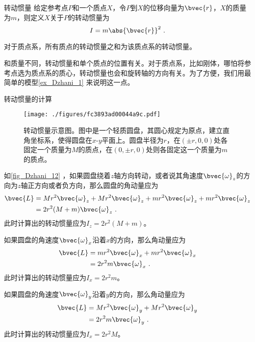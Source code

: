 \begin{definition}{转动惯量}
给定参考点$P$和一个质点$X$，令$P$到$X$的位移向量为$\bvec{r}$，$X$的质量为$m$，则定义$X$关于$P$的转动惯量为
\begin{equation}
I=m\abs{\bvec{r}}^2~. 
\end{equation}

对于质点系，所有质点的转动惯量之和为该质点系的转动惯量。
\end{definition}


和质量不同，转动惯量和单个质点的位置有关。对于质点系，比如刚体，哪怕将参考点选为质点系的质心，转动惯量也会和旋转轴的方向有关。为了方便，我们用最简单的模型\autoref{ex_Dzhani_1} 来说明这一点。



\begin{example}{转动惯量的计算}\label{ex_Dzhani_1}


\begin{figure}[ht]
\centering
\texttt{[image: ./figures/fc3893ad00044a9c.pdf]}
\caption{转动惯量示意图。图中是一个轻质圆盘，其圆心规定为原点，建立直角坐标系，使得圆盘在$x$-$y$平面上。圆盘半径为$r$，在$(\pm r, 0, 0)$处各固定一个质量为$M$的质点，在$(0, \pm r, 0)$处则各固定这一个质量为$m$的质点。} \label{fig_Dzhani_12}
\end{figure}


如\autoref{fig_Dzhani_12} ，如果圆盘绕着$z$轴方向转动，或者说其角速度$\bvec{\omega}_z$的方向为$z$轴正方向或者负方向，那么圆盘的角动量应为
\begin{equation}
\begin{aligned}
\bvec{L} ={}& Mr^2\bvec{\omega}_z+Mr^2\bvec{\omega}_z+mr^2\bvec{\omega}_z+mr^2\bvec{\omega}_z\\
={}& 2r^2(M+m)\bvec{\omega}_z ~.
\end{aligned}
\end{equation}
此时计算出的转动惯量应为$I_z=2r^2(M+m)$。

如果圆盘的角速度$\bvec{\omega}_x$沿着$x$的方向，那么角动量应为
\begin{equation}
\begin{aligned}
\bvec{L} ={}& mr^2\bvec{\omega}_x+mr^2\bvec{\omega}_x\\
={}& 2r^2m\bvec{\omega}_x ~.
\end{aligned}
\end{equation}
此时计算出的转动惯量应为$I_x=2r^2m$。

如果圆盘的角速度$\bvec{\omega}_y$沿着$y$的方向，那么角动量应为
\begin{equation}
\begin{aligned}
\bvec{L} ={}& Mr^2\bvec{\omega}_y+Mr^2\bvec{\omega}_y\\
={}& 2r^2m\bvec{\omega}_y ~.
\end{aligned}
\end{equation}
此时计算出的转动惯量应为$I_x=2r^2M$。




\end{example}



